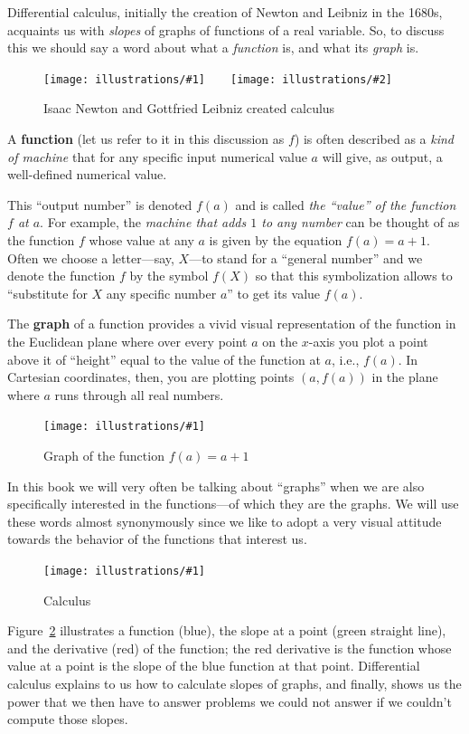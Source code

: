 \documentclass[openany]{book}
\newcommand{\ill}[3]{%
   \begin{figure}[H]%
   \vspace{-2ex}
   \centering%
   \texttt{[image: illustrations/\#1]}%
   \caption{#3}%
   \vspace{-2ex}
    \end{figure}}
\newcommand{\illtwo}[4]{%
   \begin{figure}[H]\centering%
   \texttt{[image: illustrations/\#1]}$\qquad$\texttt{[image: illustrations/\#2]}%
   \caption{#4}%
    \end{figure}}
\theoremstyle{plain}
\theoremstyle{definition}
\begin{document}
{Differential calculus, initially the creation of Newton and Leibniz
in the 1680s, acquaints us with {\it slopes} of graphs of functions of
a real variable.  So, to discuss this we should say a word about what
a {\it function} is, and what its {\it graph} is.

 \illtwo{newton}{leibniz}{0.25}{Isaac Newton and Gottfried Leibniz created calculus\index{calculus}}


 A {\bf function} (let us refer to it in this discussion as $f$) is
 often described as a {\it kind of machine} that for any specific
 input numerical value $a$ will give, as output, a well-defined
 numerical value.

 This ``output number'' is denoted $f(a)$ and is called {\it the
   ``value'' of the function $f$ at $a$}.  For example, the {\it
   machine that adds $1$ to any number} can be thought of as the
 function $f$ whose value at any $a$ is given by the equation $f(a) =
 a+1$.  Often we choose a letter---say, $X$---to stand for a ``general
 number'' and we denote the function $f$ by the symbol $f(X)$ so that
 this symbolization allows to ``substitute for $X$ any specific number
 $a$'' to get its value $f(a)$.

 The {\bf graph} of a function provides a vivid visual representation of the
 function in the Euclidean plane where over every point $a$ on the
 $x$-axis you plot a point above it of ``height'' equal to the value of
 the function at $a$, i.e., $f(a)$. In Cartesian coordinates, then,
 you are plotting points $(a, f(a))$ in the plane where $a$ runs
 through all real numbers.

 \ill{graph_aplusone}{0.6}{Graph of the function $f(a)=a+1$\label{fig:graph_aplusone}}

 In this book we will very often be talking about ``graphs'' when we
 are also specifically interested in the functions---of which they are
 the graphs. We will use these words almost synonymously since we like
 to adopt a very visual attitude towards the behavior of the functions
 that interest us.


 \ill{graph_slope_deriv}{1}{\label{fig:graph_slope_deriv}Calculus\index{calculus}}



 Figure~\ref{fig:graph_slope_deriv} illustrates a function (blue), the
 slope at a point (green straight line), and the derivative (red) of
 the function; the red derivative is the function whose value at a point
 is the slope of the blue function at that point.  Differential
 calculus explains to us how to calculate slopes of graphs, and
 finally, shows us the power that we then have to answer problems we
 could not answer if we couldn't compute those slopes.

}
\end{document}
